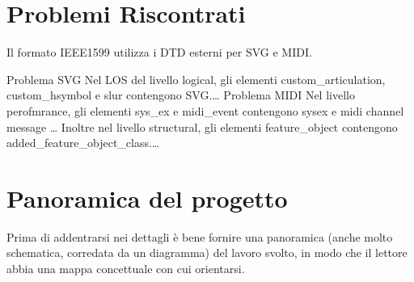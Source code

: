 \documentclass[12pt,italian]{report}
\begin{document}
\section{Problemi Riscontrati}
\label{sec:problemiriscontrati}

Il formato IEEE1599 utilizza i DTD esterni per SVG e MIDI. 

Problema SVG
Nel LOS del livello logical, gli elementi custom\_articulation, custom\_hsymbol e slur contengono SVG.\dots
Problema MIDI
Nel livello perofmrance, gli elementi sys\_ex e midi\_event contengono sysex e midi channel message \dots
Inoltre nel livello structural, gli elementi feature\_object contengono added\_feature\_object\_class.\dots

\section{Panoramica del progetto}

Prima di addentrarsi nei dettagli è bene fornire una panoramica (anche molto schematica, corredata da un diagramma) del lavoro svolto, in modo che il lettore abbia una mappa concettuale con cui orientarsi.


%
%





\closingpage
\end{document}
